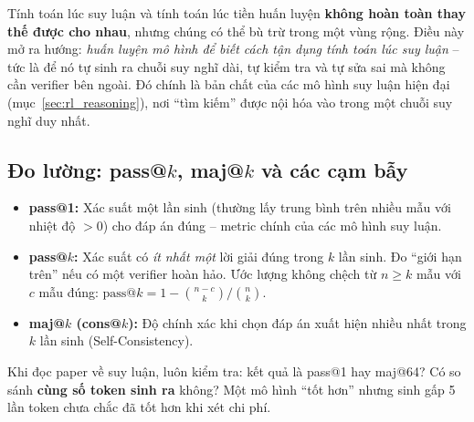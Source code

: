 \begin{center}
\label{fig:ttc_vs_pretrain}
\end{center}

\begin{tcolorbox}[title={Ý nghĩa}, colback=green!5!white, colframe=green!60!black, fonttitle=\bfseries]
Tính toán lúc suy luận và tính toán lúc tiền huấn luyện \textbf{không hoàn toàn thay thế được cho nhau}, nhưng chúng có thể bù trừ trong một vùng rộng. Điều này mở ra hướng: \emph{huấn luyện mô hình để biết cách tận dụng tính toán lúc suy luận} -- tức là để nó tự sinh ra chuỗi suy nghĩ dài, tự kiểm tra và tự sửa sai mà không cần verifier bên ngoài. Đó chính là bản chất của các mô hình suy luận hiện đại (mục~\ref{sec:rl_reasoning}), nơi “tìm kiếm” được nội hóa vào trong một chuỗi suy nghĩ duy nhất.
\end{tcolorbox}

\subsection{Đo lường: pass@$k$, maj@$k$ và các cạm bẫy}
\label{ssec:passk}
\begin{itemize}
	\item \textbf{pass@1:} Xác suất một lần sinh (thường lấy trung bình trên nhiều mẫu với nhiệt độ $>0$) cho đáp án đúng -- metric chính của các mô hình suy luận.
	\item \textbf{pass@$k$:} Xác suất có \emph{ít nhất một} lời giải đúng trong $k$ lần sinh. Đo “giới hạn trên” nếu có một verifier hoàn hảo. Ước lượng không chệch từ $n \geq k$ mẫu với $c$ mẫu đúng: $\text{pass@}k = 1 - \binom{n-c}{k}\big/\binom{n}{k}$.
	\item \textbf{maj@$k$ (cons@$k$):} Độ chính xác khi chọn đáp án xuất hiện nhiều nhất trong $k$ lần sinh (Self-Consistency).
\end{itemize}
Khi đọc paper về suy luận, luôn kiểm tra: kết quả là pass@1 hay maj@64? Có so sánh \textbf{cùng số token sinh ra} không? Một mô hình “tốt hơn” nhưng sinh gấp 5 lần token chưa chắc đã tốt hơn khi xét chi phí.
